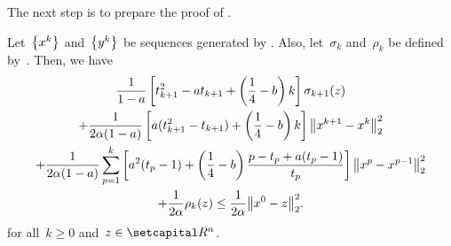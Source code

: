 \documentclass[../main]{subfiles}
\begin{document}
The next step is to prepare the proof of .
\begin{lemma} 
    Let~$\set*{x^k}$ and~$\set*{y^k}$ be sequences generated by .
    Also, let~$\sigma_k$ and~$\rho_k$ be defined by~.
    Then, we have
    \begin{multline}
        \frac{1}{1 - a} \left[ t_{k + 1}^2 - a t_{k + 1} + \left( \frac{1}{4} - b \right) k \right] \sigma_{k + 1}(z) \\
        + \frac{1}{2 \alpha (1 - a)} \left[ a (t_{k + 1}^2 - t_{k + 1}) + \left( \frac{1}{4} - b \right) k \right] \norm*{x^{k + 1} - x^k}_2^2 \\
        + \frac{1}{2 \alpha (1 - a)} \sum_{p = 1}^{k} \left[ a^2 (t_p - 1) + \left( \frac{1}{4} - b \right) \frac{p - t_p + a(t_p - 1)}{t_p} \right] \norm*{x^p - x^{p - 1}}_2^2 \\
        + \frac{1}{2 \alpha} \rho_k(z)
        \le \frac{1}{2 \alpha} \norm*{x^0 - z}_2^2
    .\end{multline}
    for all~$k \ge 0$ and~$z \in \setR^n$.
\end{lemma}
\end{document}
